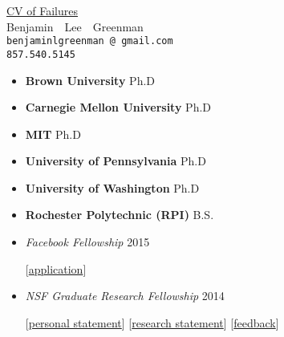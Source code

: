 \documentclass{article}
\makeatletter
\renewcommand{\maketitle}{
\begin{center}
  {\large{\href{https://www.princeton.edu/~joha/Johannes\_Haushofer\_CV\_of\_Failures.pdf}{CV of Failures}} \\
   \large{Benjamin~~Lee~~Greenman}}
\\\texttt{benjaminlgreenman\,@\,gmail.com}
\\\texttt{857.540.5145}
\end{center}
}
\makeatother
\begin{document}
\maketitle

{\centering{}}



\begin{itemize}
\item {\bf Brown University} \hfill Ph.D
\item {\bf Carnegie Mellon University} \hfill Ph.D
\item {\bf MIT} \hfill Ph.D
\item {\bf University of Pennsylvania} \hfill Ph.D
\item {\bf University of Washington} \hfill Ph.D
\item {\bf Rochester Polytechnic (RPI)} \hfill B.S.
\end{itemize}




\begin{itemize}
\item \emph{Facebook Fellowship} \hfill 2015
\item[] [\href{http://ccs.neu.edu/home/types/cv/failures/facebook-2015-reject.pdf}{application}]
\item \emph{NSF Graduate Research Fellowship} \hfill 2014
\item[] [\href{http://ccs.neu.edu/home/types/cv/failures/nsf-2014-personal-reject.pdf}{personal statement}]
        [\href{http://ccs.neu.edu/home/types/cv/failures/nsf-2014-research-reject.pdf}{research statement}]
        [\href{http://ccs.neu.edu/home/types/cv/failures/nsf-2014-reject-response.pdf}{feedback}]
\end{itemize}
\end{document}
